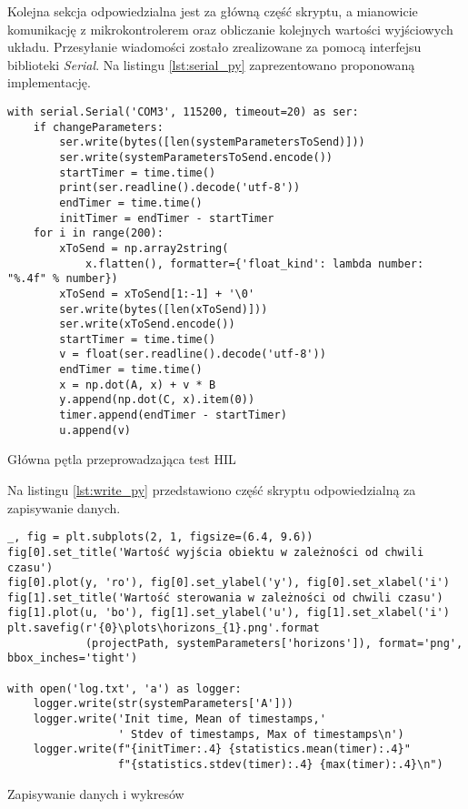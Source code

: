 Kolejna sekcja odpowiedzialna jest za główną część skryptu, a mianowicie komunikację z
mikrokontrolerem oraz obliczanie kolejnych wartości wyjściowych układu. Przesyłanie wiadomości
zostało zrealizowane za pomocą interfejsu biblioteki \textit{Serial}. Na listingu \ref{lst:serial_py}
zaprezentowano proponowaną implementację.

\begin{listing}[htb]
\begin{verbatim}
with serial.Serial('COM3', 115200, timeout=20) as ser:
    if changeParameters:
        ser.write(bytes([len(systemParametersToSend)]))
        ser.write(systemParametersToSend.encode())
        startTimer = time.time()
        print(ser.readline().decode('utf-8'))
        endTimer = time.time()
        initTimer = endTimer - startTimer
    for i in range(200):
        xToSend = np.array2string(
            x.flatten(), formatter={'float_kind': lambda number: "%.4f" % number})
        xToSend = xToSend[1:-1] + '\0'
        ser.write(bytes([len(xToSend)]))
        ser.write(xToSend.encode())
        startTimer = time.time()
        v = float(ser.readline().decode('utf-8'))
        endTimer = time.time()
        x = np.dot(A, x) + v * B
        y.append(np.dot(C, x).item(0))
        timer.append(endTimer - startTimer)
        u.append(v)
\end{verbatim}
\caption{Główna pętla przeprowadzająca test HIL}
\label{lst:serial_py}
\end{listing}

Na listingu \ref{lst:write_py} przedstawiono część skryptu odpowiedzialną za zapisywanie danych.
\begin{listing}[htb]
\begin{verbatim}
_, fig = plt.subplots(2, 1, figsize=(6.4, 9.6))
fig[0].set_title('Wartość wyjścia obiektu w zależności od chwili czasu')
fig[0].plot(y, 'ro'), fig[0].set_ylabel('y'), fig[0].set_xlabel('i')
fig[1].set_title('Wartość sterowania w zależności od chwili czasu')
fig[1].plot(u, 'bo'), fig[1].set_ylabel('u'), fig[1].set_xlabel('i')
plt.savefig(r'{0}\plots\horizons_{1}.png'.format
            (projectPath, systemParameters['horizons']), format='png', bbox_inches='tight')

with open('log.txt', 'a') as logger:
    logger.write(str(systemParameters['A']))
    logger.write('Init time, Mean of timestamps,'
                 ' Stdev of timestamps, Max of timestamps\n')
    logger.write(f"{initTimer:.4} {statistics.mean(timer):.4}"
                 f"{statistics.stdev(timer):.4} {max(timer):.4}\n")
\end{verbatim}
\caption{Zapisywanie danych i wykresów}
\label{lst:write_py}
\end{listing}

